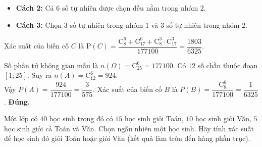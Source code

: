\begin{ex}
{\begin{itemize}
			\item \textbf{Cách 2:} Cả $6$ số tự nhiên được chọn đều nằm trong nhóm $2$.
			\item \textbf{Cách 3:} Chọn $3$ số tự nhiên trong nhóm $1$ và $3$ số tự nhiên trong nhóm $2$.
		\end{itemize}
		Xác suất của biến cố $C$ là $\mathrm{P}(C)=\dfrac{\mathrm{C}_8^6+\mathrm{C}_{17}^6+\mathrm{C}_8^3\cdot\mathrm{C}_{17}^3}{177100}=\dfrac{1803}{6325}$.
	\begin{itemchoice}
		\itemch 
		Số phần tử không gian mẫu là $n(\Omega)=\mathrm{C}_{25}^6=177100$.
		\itemch 
		Có $12$ số chẵn thuộc đoạn $[1;25]$. Suy ra $n(A)=\mathrm{C}_{12}^6=924$.\\
		Vậy $P(A)=\dfrac{924}{177100}=\dfrac{3}{575}$.
		\itemch 
		Xác suất của biến cố $B$ là $P(B)=\dfrac{\mathrm{C}_8^6}{177100}=\dfrac{1}{6325}$.
		\itemch \textbf{Đúng.}
	\end{itemchoice}
	}
\end{ex}

\begin{ex}%
	Một lớp có $40$ học sinh trong đó có $15$ học sinh giỏi Toán, $10$ học sinh giỏi Văn, $5$ học sinh giỏi cả Toán và Văn. Chọn ngẫu nhiên một học sinh. Hãy tính xác suất để học sinh đó giỏi Toán hoặc giỏi Văn (kết quả làm tròn đến hàng phần trục).
\end{ex}

